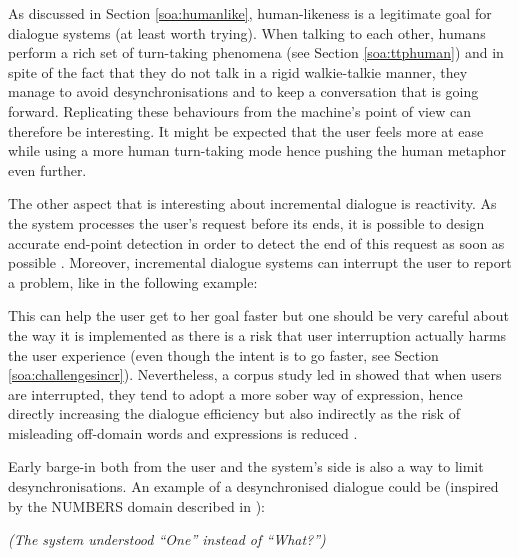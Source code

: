                As discussed in Section \ref{soa:humanlike}, human-likeness is a legitimate goal for dialogue systems (at least worth trying). When talking to each other, humans perform a rich set of turn-taking phenomena (see Section \ref{soa:ttphuman}) and in spite of the fact that they do not talk in a rigid walkie-talkie manner, they manage to avoid desynchronisations and to keep a conversation that is going forward. Replicating these behaviours from the machine's point of view can therefore be interesting. It might be expected that the user feels more at ease while using a more human turn-taking mode hence pushing the human metaphor even further.

                The other aspect that is interesting about incremental dialogue is reactivity. As the system processes the user's request before its ends, it is possible to design accurate end-point detection in order to detect the end of this request as soon as possible \cite{Raux2008}. Moreover, incremental dialogue systems can interrupt the user to report a problem, like in the following example:
                
                \begin{dialogue}
                  \end{dialogue}
                  
                  This can help the user get to her goal faster but one should be very careful about the way it is implemented as there is a risk that user interruption actually harms the user experience (even though the intent is to go faster, see Section \ref{soa:challengesincr}). Nevertheless, a corpus study led in \cite{Ghigi2014} showed that when users are interrupted, they tend to adopt a more sober way of expression, hence directly increasing the dialogue efficiency but also indirectly as the risk of misleading off-domain words and expressions is reduced \cite{Zhao2015}.
                  
                  Early barge-in both from the user and the system's side is also a way to limit desynchronisations. An example of a desynchronised dialogue could be (inspired by the NUMBERS domain described in \cite{Skantze2009}):
                  
                  \begin{dialogue}
                     \textit{(The system understood ``One'' instead of ``What?'')}
                    \end{dialogue}
                    
